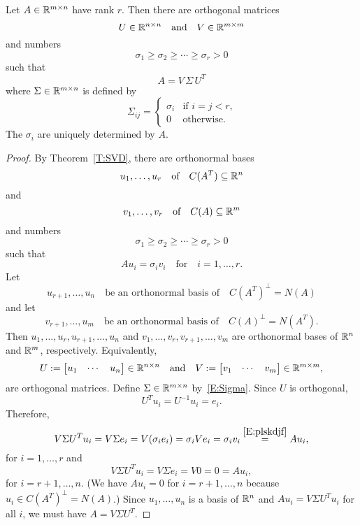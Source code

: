 \documentclass[12pt]{amsart}
\begin{document}
\begin{corollary}
    Let $A\in\mathbb{R}^{m\times n}$ have rank $r$. Then there are orthogonal matrices
    \[U\in\mathbb{R}^{n\times n}\quad\text{and}\quad V\in\mathbb{R}^{m\times m}\]
    and numbers
    \[
        \sigma_1\geq\sigma_2\geq\cdots\geq \sigma_r>0
    \]
    such that
    \[
        A = V\,\Sigma\, U^T
    \]
    where $\Sigma\in\mathbb{R}^{m\times n}$ is defined by
    \begin{equation}\label{E:Sigma}
        \Sigma_{ij} = \begin{cases}
            \sigma_i&\text{if $i=j<r$,}\\
            0&\text{otherwise.}
        \end{cases}
    \end{equation}
    The $\sigma_i$ are uniquely determined by $A$.
\end{corollary}
\begin{proof}
    By Theorem~\ref{T:SVD}, there are orthonormal bases
    \[
        u_1,\ldots,u_r\quad\text{of}\quad C(A^T)\subseteq \mathbb{R}^n
    \]
    and
    \[
        v_1,\ldots,v_r\quad\text{of}\quad C(A)\subseteq \mathbb{R}^m
    \]
    and numbers
    \[
        \sigma_1\geq\sigma_2\geq\cdots\geq \sigma_r>0
    \]
    such that
    \begin{equation}\label{E:plskdjf}
        Au_i = \sigma_i v_i\quad\text{for}\quad i=1,\ldots,r.
    \end{equation}
    Let
    \[
    u_{r+1},\ldots,u_{n}\quad
    \text{be an orthonormal basis of}\quad
    C(A^T)^\perp=N(A)
    \]
    and let
    \[
        v_{r+1},\ldots,u_{m}\quad
        \text{be an orthonormal basis of}\quad
        C(A)^\perp=N(A^T).
        \]
    Then $u_1,\ldots,u_r,u_{r+1},\ldots, u_n$ and
    $v_1,\ldots,v_r,v_{r+1},\ldots,v_m$ are orthonormal bases
    of $\mathbb{R}^n$ and $\mathbb{R}^m$, respectively.
    Equivalently,
    \[
        U:=\begin{bmatrix}
            u_1&\cdots& u_n
        \end{bmatrix}\in\mathbb{R}^{n\times n}
        \quad\text{and}\quad
        V:=\begin{bmatrix}
            v_1&\cdots& v_m
        \end{bmatrix}\in\mathbb{R}^{m\times m},
    \]
    are orthogonal matrices.
    Define $\Sigma\in\mathbb{R}^{m\times n}$ by~\eqref{E:Sigma}.
    Since $U$ is orthogonal,
    \[
        U^Tu_i = U^{-1}u_i = e_i.
    \]
    Therefore,
    \[
    V\Sigma U^Tu_i = V\Sigma e_i = 
        V(\sigma_ie_i) = \sigma_i Ve_i = \sigma_i v_i \overset{\eqref{E:plskdjf}}= Au_i,        
    \]
    for $i=1,\ldots,r$ and
    \[
    V\Sigma U^Tu_i = V\Sigma e_i = 
        V0 = 0 = Au_i,        
    \]
    for $i=r+1,\ldots,n$. (We have $Au_i=0$ for $i=r+1,\ldots,n$
    because $u_i\in C(A^T)^\perp = N(A)$.)
    Since $u_1,\ldots,u_n$ is a basis of $\mathbb{R}^n$ and $Au_i=V\Sigma U^T u_i$
    for all $i$, we must have $A = V\Sigma U^T$.
\end{proof}
\end{document}

